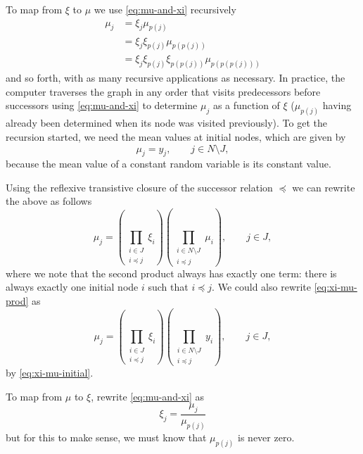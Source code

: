 To map from $\xi$ to $\mu$ we use \eqref{eq:mu-and-xi} recursively
\begin{align*}
   \mu_j
   & =
   \xi_j \mu_{p(j)}
   \\
   & =
   \xi_j \xi_{p(j)} \mu_{p(p(j))}
   \\
   & =
   \xi_j \xi_{p(j)} \xi_{p(p(j))} \mu_{p(p(p(j)))}
\end{align*}
and so forth, with as many recursive applications as necessary.  In practice,
the computer traverses the graph in any order that visits predecessors before
successors using \eqref{eq:mu-and-xi} to determine $\mu_j$ as a function of
$\xi$ ($\mu_{p(j)}$ having already been determined when its node was visited
previously).  To get the recursion started, we need the mean values at initial
nodes, which are given by
\begin{equation} \label{eq:xi-mu-initial}
   \mu_j = y_j, \qquad j \in N \setminus J,
\end{equation}
because the mean value of a constant random variable is its constant value.

Using the reflexive transistive closure of the successor relation $\preceq$
we can rewrite the above as follows
\begin{equation} \label{eq:xi-mu-prod}
    \mu_j
    =
    \left( \prod_{\substack{i \in J \\ i \preceq j}} \xi_i \right)
    \left( \prod_{\substack{i \in N \setminus J \\ i \preceq j}} \mu_i \right),
    \qquad j \in J,
\end{equation}
where we note that the second product always has exactly one term: there
is always exactly one initial node $i$ such that $i \preceq j$.
We could also rewrite \eqref{eq:xi-mu-prod} as
\begin{equation} \label{eq:xi-mu-prod-too}
    \mu_j
    =
    \left( \prod_{\substack{i \in J \\ i \preceq j}} \xi_i \right)
    \left( \prod_{\substack{i \in N \setminus J \\ i \preceq j}} y_i \right),
    \qquad j \in J,
\end{equation}
by \eqref{eq:xi-mu-initial}.

To map from $\mu$ to $\xi$, rewrite \eqref{eq:mu-and-xi} as
\begin{equation} \label{eq:mu-to-xi}
   \xi_j = \frac{\mu_j}{\mu_{p(j)}}
\end{equation}
but for this to make sense, we must know that $\mu_{p(j)}$ is never zero.

